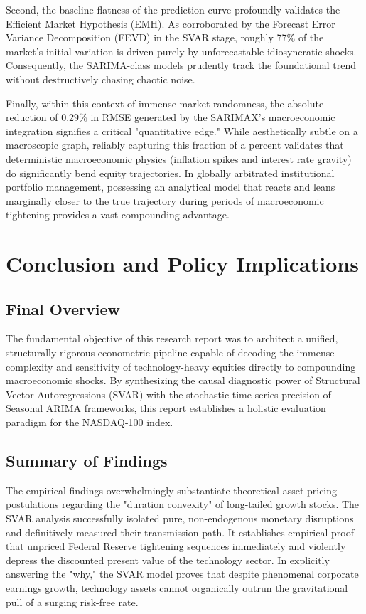 \documentclass[12pt,a4paper]{report}
\begin{document}
Second, the baseline flatness of the prediction curve profoundly validates the Efficient Market Hypothesis (EMH). As corroborated by the Forecast Error Variance Decomposition (FEVD) in the SVAR stage, roughly 77\% of the market's initial variation is driven purely by unforecastable idiosyncratic shocks. Consequently, the SARIMA-class models prudently track the foundational trend without destructively chasing chaotic noise.

Finally, within this context of immense market randomness, the absolute reduction of $0.29\%$ in RMSE generated by the SARIMAX's macroeconomic integration signifies a critical "quantitative edge." While aesthetically subtle on a macroscopic graph, reliably capturing this fraction of a percent validates that deterministic macroeconomic physics (inflation spikes and interest rate gravity) do significantly bend equity trajectories. In globally arbitrated institutional portfolio management, possessing an analytical model that reacts and leans marginally closer to the true trajectory during periods of macroeconomic tightening provides a vast compounding advantage.


\chapter{Conclusion and Policy Implications}

\section{Final Overview}
The fundamental objective of this research report was to architect a unified, structurally rigorous econometric pipeline capable of decoding the immense complexity and sensitivity of technology-heavy equities directly to compounding macroeconomic shocks. By synthesizing the causal diagnostic power of Structural Vector Autoregressions (SVAR) with the stochastic time-series precision of Seasonal ARIMA frameworks, this report establishes a holistic evaluation paradigm for the NASDAQ-100 index.

\section{Summary of Findings}
The empirical findings overwhelmingly substantiate theoretical asset-pricing postulations regarding the "duration convexity" of long-tailed growth stocks. The SVAR analysis successfully isolated pure, non-endogenous monetary disruptions and definitively measured their transmission path. It establishes empirical proof that unpriced Federal Reserve tightening sequences immediately and violently depress the discounted present value of the technology sector. In explicitly answering the "why," the SVAR model proves that despite phenomenal corporate earnings growth, technology assets cannot organically outrun the gravitational pull of a surging risk-free rate.
\end{document}
